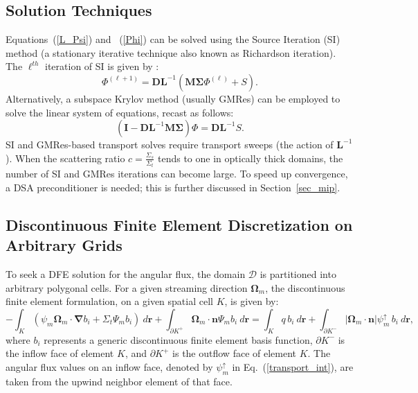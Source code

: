 \documentclass[preprint,10pt]{elsarticle}
\newcommand\bn{\boldsymbol{\nabla}}
\newcommand\bo{\boldsymbol{\Omega}}
\newcommand\br{\mathbf{r}}
\newcommand\bs{\boldsymbol}
\newcommand\mc{\mathcal}
\renewcommand{\(}{\left(}
\renewcommand{\)}{\right)}
\renewcommand{\[}{\left[}
\renewcommand{\]}{\right]}
\newcommand{\tf}{b_i}
\begin{document}
\subsection{Solution Techniques}

Equations~\textup {(\ref {L_Psi})} and~ \textup {(\ref {Phi})} can be solved using the Source Iteration (SI) method (a
stationary iterative technique also known as Richardson iteration). 
The $\ell^{th}$ iteration of SI is given by :
\begin{equation}
  \Phi^{(\ell+1)} = \bs{DL}^{-1} \(\bs{M\Sigma}\Phi^{(\ell)} + S\).
\end{equation}
Alternatively, a subspace Krylov method (usually GMRes) can be employed to
solve the linear system of equations, recast as follows:
\begin{equation}
  \(\bs{I} - \bs{DL}^{-1}\bs{M \Sigma}\) \Phi = \bs{DL}^{-1}S .
\end{equation}
SI and GMRes-based transport solves require transport sweeps (the action of $\bs{L}^{-1}$).
When the scattering ratio
$c=\frac{\Sigma_s}{\Sigma_t}$ tends to one in optically thick domains, the
number of SI and GMRes iterations can become large. To speed up convergence, a DSA
preconditioner is needed; this is further discussed in Section~\ref {sec_mip}.

\subsection{Discontinuous Finite Element Discretization on Arbitrary Grids}

To seek a DFE solution for the angular flux, the domain $\mc{D}$ is partitioned 
into arbitrary polygonal cells. For 
a given streaming direction $\bo_m$, the discontinuous finite
element formulation, on a given spatial cell $K$, is given by:
\begin{equation}
  -\int_{K} \(\psi_m \bo_m \cdot \bn \tf + \Sigma_t \Psi_m \tf \)\ d\br +
  \int_{\partial K^+} \bo_m \cdot \bs{n} \Psi_m \tf \ d\br = \int_{K} q\, \tf \ d\br +
  \int_{\partial K^{-}} |\bo_m \cdot \bs{n}| \psi_m^{\uparrow}\, \tf \ d\br,
  \label{transport_int}
\end{equation}
where $\tf$ represents a generic discontinuous finite element basis function, $\partial K^{-}$ 
is the inflow face of element $K$, and $\partial K^{+}$ is the outflow face of 
element $K$. The angular flux values on an inflow face, denoted by 
$\psi_m^{\uparrow}$ in Eq.~\textup {(\ref {transport_int})}, are taken from the upwind neighbor 
element of that face.
\end{document}
